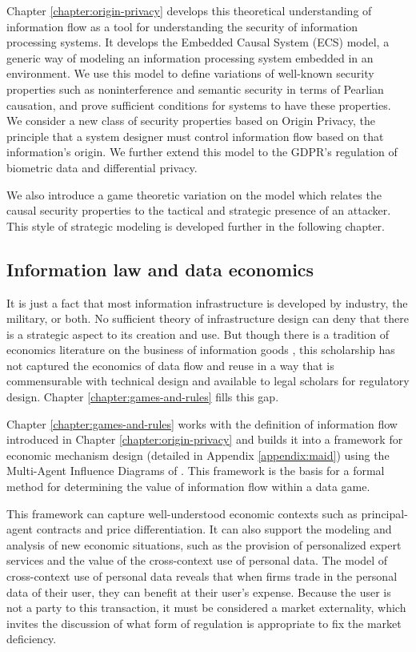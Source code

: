 \documentclass[../thesis.tex]{subfiles}
\begin{document}
 Chapter \ref{chapter:origin-privacy} develops this
 theoretical understanding of information flow as a
 tool for understanding the security of information processing
 systems.
 It develops the Embedded Causal System (ECS) model,
 a generic way of modeling an information processing system
 embedded in an environment.
 We use this model to define variations of well-known
 security properties such as noninterference and semantic
 security in terms of Pearlian causation,
 and prove sufficient conditions for systems to have these
 properties.
 We consider a new class of security properties based on
 Origin Privacy, the principle that a system designer
 must control information flow based on that information's
 origin.
 We further extend this model to the GDPR's regulation of
 biometric data and differential privacy.

 We also introduce a game theoretic variation on the model
 which relates the causal security properties to the tactical
 and strategic presence of an attacker.
 This style of strategic modeling is developed further in
 the following chapter.

 \subsection{Information law and data economics}

 It is just a fact that most information infrastructure
 is developed by industry, the military, or both.
 No sufficient theory of infrastructure design can
 deny that there is a strategic aspect to its
 creation and use.
 But though there is a tradition of economics literature
 on the business of information goods
\cite{shapiro1998information}
\cite{varian2001economics} \cite{acquisti2016economics},
this scholarship has not captured the economics of data flow
and reuse
in a way that is commensurable with technical design and
available to legal scholars for regulatory design.
Chapter \ref{chapter:games-and-rules} fills this gap.

 Chapter \ref{chapter:games-and-rules} works with the
 definition of information flow introduced in
 Chapter \ref{chapter:origin-privacy} and builds
 it into a framework for economic mechanism design
 (detailed in Appendix \ref{appendix:maid})
 using the Multi-Agent Influence Diagrams
 of \citet{koller2003multi}.
 This framework is the basis for a formal method for
 determining the value of information flow within a
 data game.

 This framework can capture well-understood economic
 contexts such as principal-agent contracts and
 price differentiation.
 It can also support the modeling and analysis of
 new economic situations, such as the provision
 of personalized expert services and the
 value of the cross-context use of personal data.
 The model of cross-context use of personal data
 reveals that when firms trade in the personal data
 of their user, they can benefit at their user's expense.
 Because the user is not a party to this transaction,
 it must be considered a market externality,
 which invites the discussion of what form of
 regulation is appropriate to fix the market deficiency.
\end{document}
